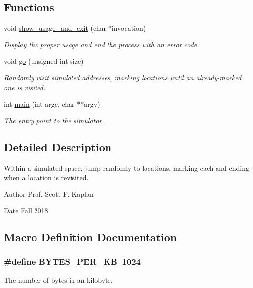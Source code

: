 \subsection*{Functions}
\begin{DoxyCompactItemize}
\item 
void \hyperlink{random-hop_8c_a4c03bd347423374d85d921056bd14e5c}{show\+\_\+usage\+\_\+and\+\_\+exit} (char $\ast$invocation)
\begin{DoxyCompactList}\small\item\em Display the proper usage and end the process with an error code. \end{DoxyCompactList}\item 
void \hyperlink{random-hop_8c_a19ca1a272fed125876eb02b534d261f3}{go} (unsigned int size)
\begin{DoxyCompactList}\small\item\em Randomly visit simulated addresses, marking locations until an already-\/marked one is visited. \end{DoxyCompactList}\item 
int \hyperlink{random-hop_8c_a3c04138a5bfe5d72780bb7e82a18e627}{main} (int argc, char $\ast$$\ast$argv)
\begin{DoxyCompactList}\small\item\em The entry point to the simulator. \end{DoxyCompactList}\end{DoxyCompactItemize}


\subsection{Detailed Description}
Within a simulated space, jump randomly to locations, marking each and ending when a location is revisited. 

\begin{DoxyAuthor}{Author}
Prof. Scott F. Kaplan 
\end{DoxyAuthor}
\begin{DoxyDate}{Date}
Fall 2018 
\end{DoxyDate}


\subsection{Macro Definition Documentation}
\hypertarget{random-hop_8c_ab5fde4a4261bca6820d8cd5b0d3a1b8d}{
\subsubsection[{B\+Y\+T\+E\+S\+\_\+\+P\+E\+R\+\_\+\+K\+B}]{\setlength{\rightskip}{0pt plus 5cm}\#define B\+Y\+T\+E\+S\+\_\+\+P\+E\+R\+\_\+\+K\+B~1024}}\label{random-hop_8c_ab5fde4a4261bca6820d8cd5b0d3a1b8d}
The number of bytes in an kilobyte. 

